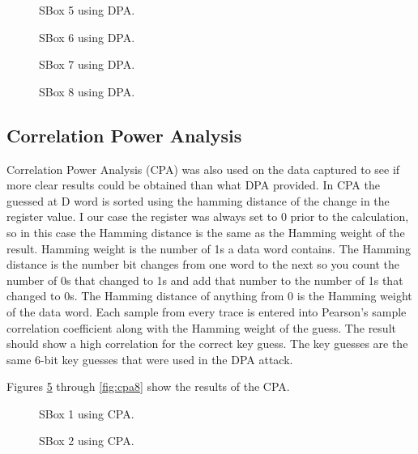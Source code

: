  \begin{figure}[h]
  
  \caption{SBox 5 using DPA.}
	\label{fig:dpa5}
  \end{figure}
  
  \begin{figure}[h]
  
  \caption{SBox 6 using DPA.}
	\label{fig:dpa6}
  \end{figure}
  
  \begin{figure}[h]
  
  \caption{SBox 7 using DPA.}
	\label{fig:dpa7}
  \end{figure}
  
  \begin{figure}[h]
  
  \caption{SBox 8 using DPA.}
	\label{fig:dpa8}
  \end{figure}
		
\subsection{Correlation Power Analysis}
  Correlation Power Analysis (CPA) was also used on the data captured to see if more clear results could be obtained than what DPA provided.  In CPA the guessed at D word is sorted using the hamming distance of the change in the register value.  I our case the register was always set to 0 prior to the calculation, so in this case the Hamming distance is the same as the Hamming weight of the result.  Hamming weight is the number of 1s a data word contains.  The Hamming distance is the number bit changes from one word to the next so you count the number of 0s that changed to 1s and add that number to the number of 1s that changed to 0s.  The Hamming distance of anything from 0 is the Hamming weight of the data word.
  Each sample from every trace is entered into Pearson's sample correlation coefficient along with the Hamming weight of the guess.  The result should show a high correlation for the correct key guess.  The key guesses are the same 6-bit key guesses that were used in the DPA attack.

  Figures \ref{fig:cpa1} through \ref{fig:cpa8} show the results of the CPA.
  
  \begin{figure}[h]
  
  \caption{SBox 1 using CPA.}
	\label{fig:cpa1}
  \end{figure}

  \begin{figure}[h]
  
  \caption{SBox 2 using CPA.}
	\label{fig:cpa2}
  \end{figure}

